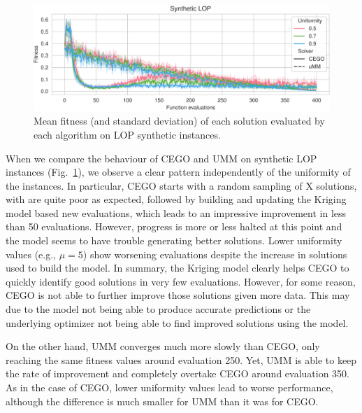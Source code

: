 \documentclass[runningheads]{llncs}
\begin{document}
\begin{figure}[tb]
  \centering%
  \includegraphics[width=\textwidth]{../img/synthetic_LOP_combined}
  \caption{Mean fitness  (and standard deviation)  of each solution evaluated by each algorithm on LOP synthetic instances.\label{fig:lop_synth}}
\end{figure}

When we compare the behaviour of CEGO and UMM on synthetic LOP instances
(Fig.~\ref{fig:lop_synth}), we observe a clear pattern independently of the
uniformity of the instances. In particular, CEGO starts with a random sampling
of X solutions, with are quite poor as expected, followed by building and
updating the Kriging model based new evaluations, which leads to an impressive
improvement in less than 50 evaluations. However, progress is more or less
halted at this point and the model seems to have trouble generating better
solutions. Lower uniformity values (e.g., $\mu=5$) show worsening evaluations
despite the increase in solutions used to build the model. In summary, the
Kriging model clearly helps CEGO to quickly identify good solutions in very few
evaluations. However, for some reason, CEGO is not able to further improve
those solutions given more data. This may due to the model not being able to
produce accurate predictions or the underlying optimizer not being able to find
improved solutions using the model.


On the other hand, UMM converges much more slowly than CEGO, only reaching the
same fitness values around evaluation 250. Yet, UMM is able to keep the rate of
improvement and completely overtake CEGO around evaluation 350. As in the case
of CEGO, lower uniformity values lead to worse performance, although the
difference is much smaller for UMM than it was for CEGO.


\newcommand{\supplement}{\citep{Supplementary}}
\end{document}
